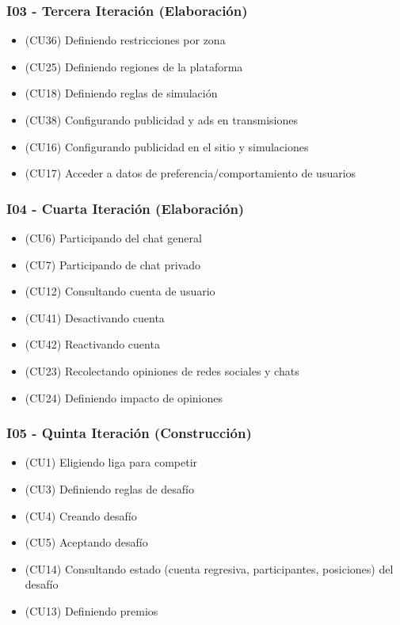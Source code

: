 \subsubsection{I03 - Tercera Iteración (Elaboración)}
\begin{itemize}
\item (CU36) Definiendo restricciones por zona
\item (CU25) Definiendo regiones de la plataforma
\item (CU18) Definiendo reglas de simulación
\item (CU38) Configurando publicidad y ads en transmisiones
\item (CU16) Configurando publicidad en el sitio y simulaciones
\item (CU17) Acceder a datos de preferencia/comportamiento de usuarios
\end{itemize}


\subsubsection{I04 - Cuarta Iteración (Elaboración)}
\begin{itemize}
\item (CU6) Participando del chat general
\item (CU7) Participando de chat privado
\item (CU12) Consultando cuenta de usuario
\item (CU41) Desactivando cuenta
\item (CU42) Reactivando cuenta
\item (CU23) Recolectando opiniones de redes sociales y chats
\item (CU24) Definiendo impacto de opiniones
\end{itemize}

\subsubsection{I05 - Quinta Iteración (Construcción)}
\begin{itemize}
\item (CU1) Eligiendo liga para competir
\item (CU3) Definiendo reglas de desafío
\item (CU4) Creando desafío
\item (CU5) Aceptando desafío
\item (CU14) Consultando estado (cuenta regresiva, participantes, posiciones) del desafío
\item (CU13) Definiendo premios
\end{itemize}

